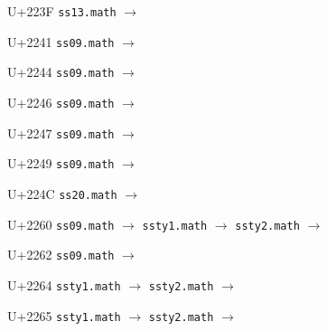 \documentclass{article}
\begin{document}
\begin{substitutions}
U+223F  \linebreak
    \texttt{ss13.math} $\to$  

\goodbreak

U+2241  \linebreak
    \texttt{ss09.math} $\to$  

\goodbreak

U+2244  \linebreak
    \texttt{ss09.math} $\to$  

\goodbreak

U+2246  \linebreak
    \texttt{ss09.math} $\to$  

\goodbreak

U+2247  \linebreak
    \texttt{ss09.math} $\to$  

\goodbreak

U+2249  \linebreak
    \texttt{ss09.math} $\to$  

\goodbreak

U+224C  \linebreak
    \texttt{ss20.math} $\to$  

\goodbreak

U+2260  \linebreak
    \texttt{ss09.math} $\to$  \linebreak
    \texttt{ssty1.math} $\to$  \linebreak
    \texttt{ssty2.math} $\to$  

\goodbreak

U+2262  \linebreak
    \texttt{ss09.math} $\to$  

\goodbreak

U+2264  \linebreak
    \texttt{ssty1.math} $\to$  \linebreak
    \texttt{ssty2.math} $\to$  

\goodbreak

U+2265  \linebreak
    \texttt{ssty1.math} $\to$  \linebreak
    \texttt{ssty2.math} $\to$  


\end{substitutions}
\end{document}

